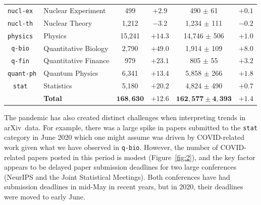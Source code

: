 \documentclass[]{rsos}%
\newcommand{\arxiv}{arXiv}
\begin{document}
\begin{table}
\begin{center}
\begin{tabular}{|c|l|c|c|c|c|}
\texttt{nucl-ex }    & Nuclear Experiment     & 499       & $ +2.9$ & 490 $\pm$ 61          & $+0.1$ \\
\texttt{nucl-th }    & Nuclear Theory         & 1,212     & $ -3.2$ & 1,234 $\pm$ 111       & $-0.2$ \\
\texttt{physics }    & Physics                & 15,241    & $+14.3$ & 14,746 $\pm$ 506      & $+1.0$ \\
\texttt{q-bio   }    & Quantitative Biology   & 2,790     & $+49.0$ & 1,914 $\pm$ 109       & $+8.0$ \\
\texttt{q-fin   }    & Quantitative Finance   & 979       & $+23.1$ & 805 $\pm$ 55          & $+3.2$ \\
\texttt{quant-ph}    & Quantum Physics        & 6,341     & $+13.4$ & 5,858 $\pm$ 266       & $+1.8$ \\
\texttt{stat    }    & Statistics             & 5,180     & $+20.2$ & 4,824 $\pm$ 490       & $+0.7$ \\
\hline
&\cellcolor{gray!25}\textbf{Total} & \cellcolor{gray!25}$\mathbf{168{,}630}$ & \cellcolor{gray!25}$\mathbf{+12.6}$ & \cellcolor{gray!25}$\mathbf{162{,}577 \pm 4{,}393}$ \cellcolor{gray!25}& \cellcolor{gray!25}$\mathbf{+1.4}$ \\
\hline 
    \end{tabular}
  \end{center}
\end{table}







The pandemic has also created distinct challenges when interpreting trends in \arxiv\ data. For example, there was a large spike in papers submitted to the \texttt{stat} category in June 2020 which one might assume was driven by COVID-related work given what we have observed in \texttt{q-bio}. However, the number of COVID-related papers posted in this period is modest (Figure~\ref{fig:2}), and the key factor appears to be delayed paper submission deadlines for two large conferences (NeurIPS and the Joint Statistical Meetings). Both conferences have had submission deadlines in mid-May in recent years, but in 2020, their deadlines were moved to early June.
\end{document}
